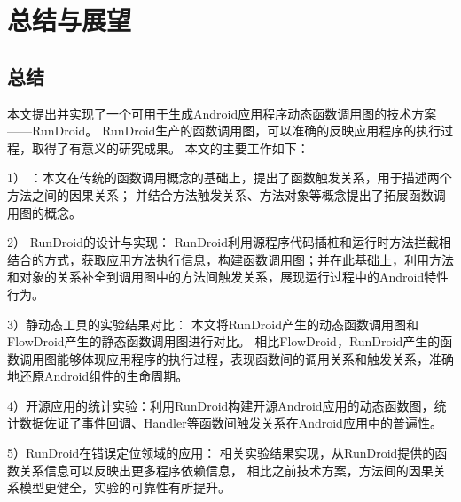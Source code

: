 \chapter{总结与展望}
\label{chp:future}
\section{总结}


本文提出并实现了一个可用于生成Android应用程序动态函数调用图的技术方案——RunDroid。
RunDroid生产的函数调用图，可以准确的反映应用程序的执行过程，取得了有意义的研究成果。
本文的主要工作如下：


1） \ecg：本文在传统的函数调用概念的基础上，提出了函数触发关系，用于描述两个方法之间的因果关系；
并结合方法触发关系、方法对象等概念提出了拓展函数调用图的概念。

2） RunDroid的设计与实现：
RunDroid利用源程序代码插桩和运行时方法拦截相结合的方式，获取应用方法执行信息，构建函数调用图；并在此基础上，利用方法和对象的关系补全到调用图中的方法间触发关系，展现运行过程中的Android特性行为。


3）静动态工具的实验结果对比：
本文将RunDroid产生的动态函数调用图和FlowDroid产生的静态函数调用图进行对比。
相比FlowDroid，RunDroid产生的函数调用图能够体现应用程序的执行过程，表现函数间的调用关系和触发关系，准确地还原Android组件的生命周期。

4）开源应用的统计实验：利用RunDroid构建开源Android应用的动态函数图，统计数据佐证了事件回调、Handler等函数间触发关系在Android应用中的普遍性。



5）RunDroid在错误定位领域的应用：
相关实验结果实现，从RunDroid提供的函数关系信息可以反映出更多程序依赖信息，
相比之前技术方案，方法间的因果关系模型更健全，实验的可靠性有所提升。










